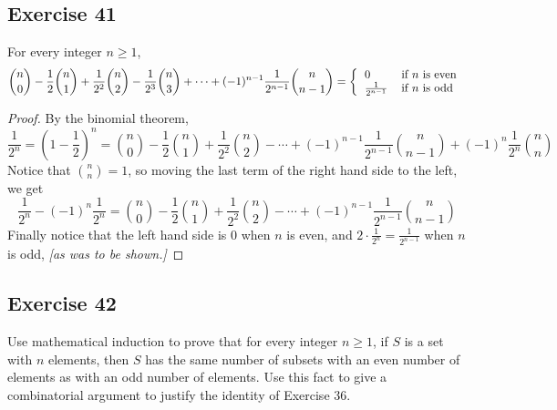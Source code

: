 \documentclass[14pt]{extarticle}
\begin{document}
\subsection{Exercise 41}
For every integer \(n \geq 1\),
\[
     \binom{n}{0} - \frac{1}{2}\binom{n}{1} + \frac{1}{2^2}\binom{n}{2} - \frac{1}{2^3}\binom{n}{3} + \cdots + (-1)^{n-1}
     \frac{1}{2^{n-1}}\binom{n}{n-1} =
     \left\{
     \begin{tabular}{ll}
          \(0\)                 & if \(n\) is even \\
          \(\frac{1}{2^{n-1}}\) & if \(n\) is odd
     \end{tabular}
     \right.
\]
\begin{proof}
     By the binomial theorem,
     \[
          \frac{1}{2^n} = (1-\frac{1}{2})^n = \binom{n}{0}- \frac{1}{2}\binom{n}{1} + \frac{1}{2^2} \binom{n}{2} - \cdots +
          (-1)^{n-1} \frac{1}{2^{n-1}} \binom{n}{n-1} + (-1)^{n} \frac{1}{2^{n}}\binom{n}{n}
     \]
     Notice that \(\binom{n}{n} = 1\), so moving the last term of the right hand side to the left, we get
     \[
          \frac{1}{2^n} - (-1)^{n} \frac{1}{2^{n}} = \binom{n}{0}- \frac{1}{2}\binom{n}{1} + \frac{1}{2^2} \binom{n}{2} - \cdots
          + (-1)^{n-1} \frac{1}{2^{n-1}} \binom{n}{n-1}
     \]
     Finally notice that the left hand side is 0 when \(n\) is even, and \(2 \cdot \frac{1}{2^n} = \frac{1}{2^{n-1}}\) when
     \(n\) is odd, {\it [as was to be shown.]}
\end{proof}

\subsection{Exercise 42}
Use mathematical induction to prove that for every integer \(n \geq 1\), if \(S\) is a set with \(n\) elements, then \(S\)
has the same number of subsets with an even number of elements as with an odd number of elements. Use this fact to give a
combinatorial argument to justify the identity of Exercise 36.
\end{document}
